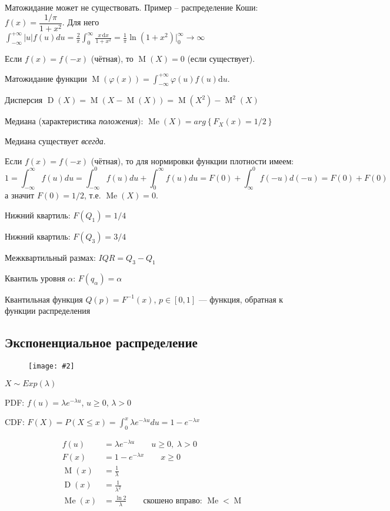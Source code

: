 \documentclass[a4paper,12pt,fleqn]{article}
\numberwithin{figure}{section}
\newcommand\cfigure[2]{
	\begin{figure}[H] \centering \texttt{[image: \#2]} \end{figure}
}
\theoremstyle{definition}
\let\phi\varphi
\let\leqs\leqslant
\let\geqs\geqslant
\let\DS\displaystyle
\def\d{\mathrm{d}}
\DeclareMathOperator{\M}{M}
\DeclareMathOperator{\D}{D}
\DeclareMathOperator{\Me}{Me}
\begin{document}
Матожидание может не существовать.
Пример -- распределение Коши: $f(x)=\dfrac{1/\pi}{1+x^2}$.
Для него $\DS \int_{-\infty}^{+\infty}|u|f(u)du
            = \frac2\pi \int_0^\infty \frac{x\,\mathrm{d}x}{1+x^2}
            = \frac1\pi \ln(1+x^2) \Big\rvert_0^\infty \to \infty$

Если $f(x)=f(-x)$ (чётная), то $\M(X)=0$ (если существует).

\medskip

Матожидание функции
$\M\left( \phi(x) \right) = \int_{-\infty}^{+\infty}\phi(u) f(u) \d u$.

\medskip

Дисперсия $\D(X) = \M\left( X-\M(X) \right) = \M(X^2)-\M^2(X)$

\bigskip

Медиана (характеристика \textit{положения}):
$\Me(X) = arg \left\{ F_X(x) = 1/2 \right\}$

Медиана существует \textit{всегда}.

Если $f(x)=f(-x)$ (чётная), то для нормировки функции плотности имеем:
\[ 1 = \int_{-\infty}^\infty f(u)du
     = \int_{-\infty}^0 f(u)du + \int_0^\infty f(u)du
     = F(0) + \int_\infty^0 f(-u)d(-u) = F(0) + F(0) \]
а значит $F(0)=1/2$, т.е. $\Me(X) = 0$.

\bigskip

Нижний квартиль: $F(Q_1) = 1/4$

Нижний квартиль: $F(Q_3) = 3/4$

Межквартильный размах: $IQR=Q_3-Q_1$

\medskip

Квантиль уровня $\alpha$: $F(q_{\alpha})=\alpha$

Квантильная функция $Q(p)=F^{-1}(x)$, $p\!\in\![0,1]$ ---
функция, обратная к функции распределения


\subsection{Экспоненциальное распределение}

\cfigure{.9\linewidth}{exp-dist.png}

$X \sim Exp(\lambda)$

PDF: $\DS f(u) = \lambda e^{-\lambda u}$, $u\geqs0$, $\lambda>0$

CDF: $\DS F(X) = P(X\leqs x) = \int_0^x \lambda e^{-\lambda u} du = 1-e^{-\lambda x}$

\begin{align*}
	   f(u)&=\lambda e^{-\lambda u} \qquad u\geqs 0 ,\; \lambda>0
	\\ F(x)&=1-e^{-\lambda x} \qquad x\geqs 0
	\\ \M(x)&=\frac{1}{\lambda}
	\\ \D(x)&=\frac{1}{\lambda^2}
	\\ \Me(x)&=\frac{\ln 2}{\lambda} \qquad \text{скошено вправо: } \Me < \M
\end{align*}
\end{document}
